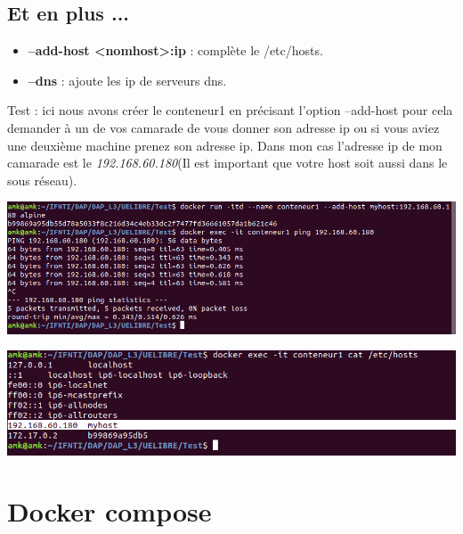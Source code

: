\documentclass[12pt,a4paper]{article}
\begin{document}
\subsection{Et en plus ...}
\begin{itemize}
\item \textbf{--add-host <nomhost>:ip} : complète le /etc/hosts.
\item \textbf{--dns} : ajoute les ip de serveurs dns.
\end{itemize}

Test : ici nous avons créer le conteneur1 en précisant l'option --add-host pour cela 
demander à un de vos camarade de vous donner son adresse ip ou si vous aviez une deuxième
machine prenez son adresse ip. Dans mon cas l'adresse ip de mon camarade est le 
\textit{192.168.60.180}(Il est important que votre host soit aussi dans le sous réseau). 
\begin{center}
\includegraphics[scale=0.5]{img/add_host.png}
\end{center}
\begin{center}
\includegraphics[scale=0.5]{img/add_host_2.png}
\end{center}

\section{Docker compose}
\end{document}
